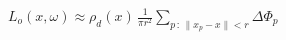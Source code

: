 \documentclass[border=6pt]{standalone}
\begin{document}
\color{white}
\(\displaystyle
L_o(x,\omega)
\approx
\rho_d(x)\,
\frac{1}{\pi r^2}
\sum_{p\,:\,\lVert x_p-x\rVert < r}
\Delta\Phi_p
\)
\end{document}
